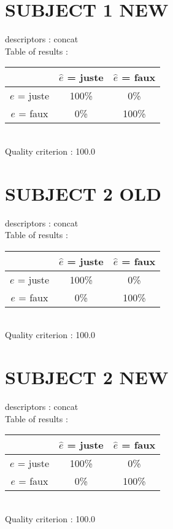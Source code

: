 \section*{SUBJECT 1 NEW}
descriptors : concat \\
Table of results : \\
\begin{tabular}{|c|c|c|}
\hline				& $\hat{e}$ = juste & $\hat{e}$ = faux \\
\hline  $e$ = juste	&    100\%			&      0\%		\\
\hline  $e$ = faux	&      0\%			&    100\%		\\
\hline
\end{tabular}\\
Quality criterion :  100.0 \\

\newpage
\section*{SUBJECT 2 OLD}
descriptors : concat \\
Table of results : \\
\begin{tabular}{|c|c|c|}
\hline				& $\hat{e}$ = juste & $\hat{e}$ = faux \\
\hline  $e$ = juste	&    100\%			&      0\%		\\
\hline  $e$ = faux	&      0\%			&    100\%		\\
\hline
\end{tabular}\\
Quality criterion :  100.0 \\

\newpage
\section*{SUBJECT 2 NEW}
descriptors : concat \\
Table of results : \\
\begin{tabular}{|c|c|c|}
\hline				& $\hat{e}$ = juste & $\hat{e}$ = faux \\
\hline  $e$ = juste	&    100\%			&      0\%		\\
\hline  $e$ = faux	&      0\%			&    100\%		\\
\hline
\end{tabular}\\
Quality criterion :  100.0 \\

